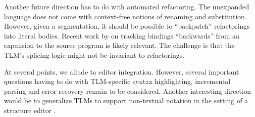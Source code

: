 \documentclass[acmsmall]{acmart}
\begin{document}

Another future direction has to do with automated refactoring. The unexpanded language does not come with context-free notions of renaming and substitution. However, given a segmentation, it should be possible to ``backpatch'' refactorings into literal bodies. Recent work by \citet{wand2017inferring} on tracking bindings ``backwards'' from an expansion to the source program is likely relevant. The challenge is that the TLM's splicing logic might not be invariant to refactorings.

At several points, we allude to editor integration. However, several important questions having to do with TLM-specific syntax highlighting, incremental parsing and error recovery \cite{graham1979practical} remain to be considered. Another interesting direction would be to generalize TLMs to support non-textual notation in the setting of a structure editor \cite{DBLP:conf/popl/OmarVHAH17}.


\end{document}
